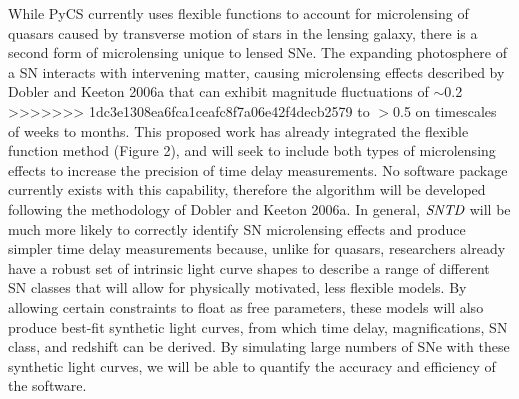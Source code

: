 

While PyCS currently uses flexible functions to account for
microlensing of quasars caused by transverse motion of stars in the
lensing galaxy, there is a second form of microlensing unique to
lensed SNe. The expanding photosphere of a SN interacts with
intervening matter, causing microlensing effects described by Dobler
and Keeton 2006a that can exhibit magnitude fluctuations of $\sim$0.2
>>>>>>> 1dc3e1308ea6fca1ceafc8f7a06e42f4decb2579
to $>$0.5 on timescales of weeks to months. This proposed work has
already integrated the flexible function method (Figure 2), and will
seek to include both types of microlensing effects to increase the
precision of time delay measurements. No software package currently
exists with this capability, therefore the algorithm will be developed
following the methodology of Dobler and Keeton 2006a. In general,
$\textit{SNTD}$ will be much more likely to correctly identify SN
microlensing effects and produce simpler time delay measurements
because, unlike for quasars, researchers already have a robust set of
intrinsic light curve shapes to describe a range of different SN
classes that will allow for physically motivated, less flexible
models. By allowing certain constraints to float as free parameters,
these models will also produce best-fit synthetic light curves, from
which time delay, magnifications, SN class, and redshift can be
derived. By simulating large numbers of SNe with these synthetic light
curves, we will be able to quantify the accuracy and efficiency of the
software.




